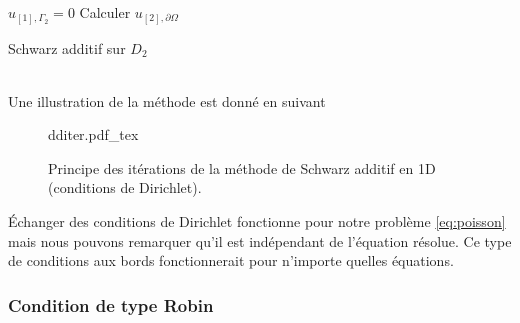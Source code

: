 \documentclass[a4paper,11pt]{article}
\newcommand{\incfig}[2]{%
	\def\svgwidth{#1\textwidth}
	\centering
	{#2.pdf_tex}
}
\begin{document}
\begin{minipage}{0.47\textwidth}
	\begin{algorithm}[H]
		\SetAlgoLined
		$u_{[1], \Gamma_2} = 0$\;
		Calculer $u_{[2], \partial\Omega}$\;
\caption*{Schwarz additif sur $D_2$}
	\end{algorithm}
\end{minipage}
\vspace{3mm}\\
\noindent Une illustration de la méthode est donné en suivant
\begin{figure}[H]
	\incfig{0.5}{dditer}
	\caption{Principe des itérations de la méthode de Schwarz additif en 1D (conditions de Dirichlet).}
\end{figure}
\noindent Échanger des conditions de Dirichlet fonctionne pour notre problème \eqref{eq:poisson} mais nous pouvons remarquer qu'il est indépendant de l'équation résolue. Ce type de conditions aux bords fonctionnerait pour n'importe quelles équations.\\

\subsubsection{Condition de type Robin}
\end{document}
